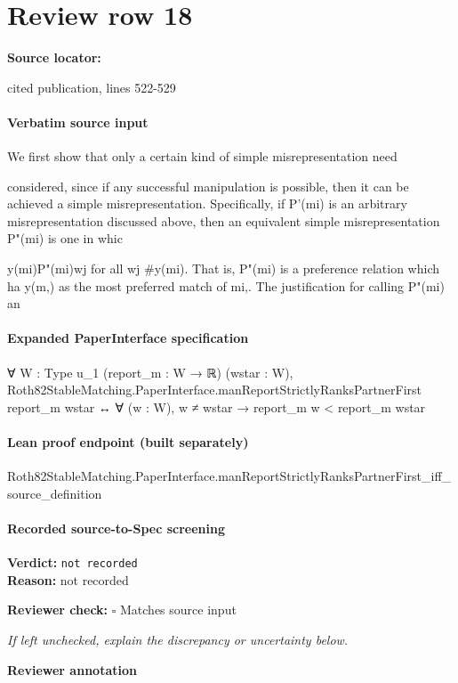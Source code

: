 \documentclass[10pt]{article}
\newcommand{\reviewerbox}{%
  \par\noindent\fbox{\parbox{0.96\linewidth}{\rule{0pt}{0.38in}}}\par
}
\newcommand{\reviewmatch}[1]{%
  \par\noindent\textbf{Reviewer check:} $\square$\; #1\par
  \noindent\emph{If left unchecked, explain the discrepancy or uncertainty below.}\par
}
\begin{document}
\section*{Review row 18}
\textbf{Source locator:} {\footnotesize\raggedright cited publication, lines 522-\allowbreak{}529\par}
\paragraph{Verbatim source input}
\begin{ReviewVerbatim}
We first show that only a certain kind of simple misrepresentation need

considered, since if any successful manipulation is possible, then it can be achieved
a simple misrepresentation. Specifically, if P'(mi) is an arbitrary misrepresentation
discussed above, then an equivalent simple misrepresentation P"(mi) is one in whic

y(mi)P"(mi)wj for all wj #y(mi). That is, P"(mi) is a preference relation which ha
y(m,) as the most preferred match of mi,. The justification for calling P"(mi) an
\end{ReviewVerbatim}


\paragraph{Expanded PaperInterface specification}
\begin{ReviewVerbatim}
∀ {W : Type u_1} (report_m : W → ℝ) (wstar : W),
  Roth82StableMatching.PaperInterface.manReportStrictlyRanksPartnerFirst report_m wstar ↔
    ∀ (w : W), w ≠ wstar → report_m w < report_m wstar
\end{ReviewVerbatim}

\paragraph{Lean proof endpoint (built separately)}\begin{ReviewVerbatim}
Roth82StableMatching.PaperInterface.manReportStrictlyRanksPartnerFirst_iff_source_definition
\end{ReviewVerbatim}

\paragraph{Recorded source-to-Spec screening}
\textbf{Verdict:} \texttt{not recorded}
\\
\textbf{Reason:} not recorded
\reviewmatch{Matches source input}
\noindent\textbf{Reviewer annotation}\par
\reviewerbox
\clearpage
\hypertarget{source-claim-e79a67a30eb14eca}{}
\end{document}
